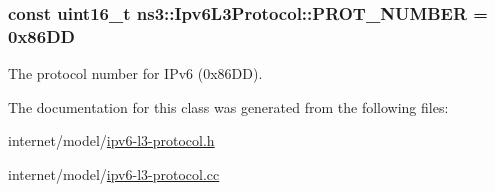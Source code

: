 \subsubsection[{\texorpdfstring{P\+R\+O\+T\+\_\+\+N\+U\+M\+B\+ER}{PROT_NUMBER}}]{\setlength{\rightskip}{0pt plus 5cm}const uint16\+\_\+t ns3\+::\+Ipv6\+L3\+Protocol\+::\+P\+R\+O\+T\+\_\+\+N\+U\+M\+B\+ER = 0x86\+DD\hspace{0.3cm}{\ttfamily [static]}}\hypertarget{classns3_1_1Ipv6L3Protocol_ac44af6866e3ddd3f0cb9fbe228afdfe9}{}\label{classns3_1_1Ipv6L3Protocol_ac44af6866e3ddd3f0cb9fbe228afdfe9}


The protocol number for I\+Pv6 (0x86\+DD). 



The documentation for this class was generated from the following files\+:\begin{DoxyCompactItemize}
\item 
internet/model/\hyperlink{ipv6-l3-protocol_8h}{ipv6-\/l3-\/protocol.\+h}\item 
internet/model/\hyperlink{ipv6-l3-protocol_8cc}{ipv6-\/l3-\/protocol.\+cc}\end{DoxyCompactItemize}
